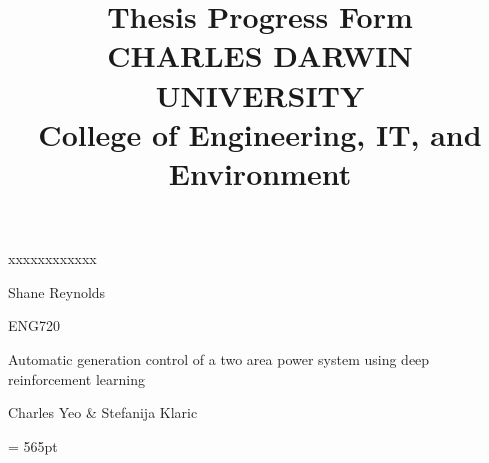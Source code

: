 \documentclass[12pt]{article}
\title{	
		Thesis Progress Form\\
		CHARLES DARWIN UNIVERSITY\\
		College of Engineering, IT, and Environment
	  }
\author{}
\date{}
\begin{document}
	
	\maketitle
	
	\begin{namelist}{xxxxxxxxxxxx}
		\item[{\bf Name:}]
			Shane Reynolds
		\item[{\bf Unit:}]
			ENG720
		\item[{\bf Title:}]
			Automatic generation control of a two area power system using deep reinforcement learning
		\item[{\bf Supervisors:}]
			Charles Yeo \& Stefanija Klaric
		\item[{\bf Time \& Date:} \today \ @ 2.30pm]
			
	\end{namelist}
	
	\pagestyle{plain} %
	\textheight = 565pt %
	
\end{document}
